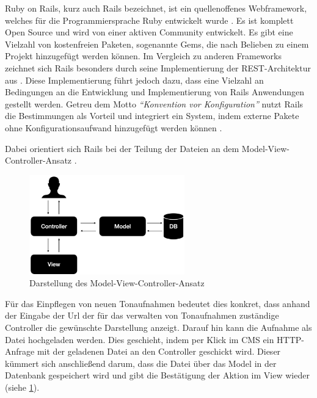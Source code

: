 Ruby on Rails, kurz auch Rails bezeichnet, ist ein quellenoffenes Webframework, welches für die Programmiersprache Ruby entwickelt wurde \parencites[vgl.][S.4]{hartl_ruby_2016}{ruby_org}[vgl.][S. 24]{sieben_wochen}. Es ist komplett Open Source und wird von einer aktiven Community entwickelt. Es gibt eine Vielzahl von kostenfreien Paketen, sogenannte Gems, die nach Belieben zu einem Projekt hinzugefügt werden können. Im Vergleich zu anderen Frameworks zeichnet sich Rails besonders durch seine Implementierung der REST-Architektur aus \parencite[vgl.][S. 5]{hartl_ruby_2016}. Diese Implementierung führt jedoch dazu, dass eine Vielzahl an Bedingungen an die Entwicklung und Implementierung von Rails Anwendungen gestellt werden. Getreu dem Motto \textit{\enquote{Konvention vor Konfiguration}} nutzt Rails die Bestimmungen als Vorteil und integriert ein System, indem externe Pakete ohne Konfigurationsaufwand hinzugefügt werden können \parencite{ruby_doctrine}.

Dabei orientiert sich Rails bei der Teilung der Dateien an dem Model-View-Controller-Ansatz \parencites[vgl.][S. 66 ff.]{hartl_ruby_2016}.

\begin{figure}
	\centering
	\includegraphics[width=0.6\textwidth]{Assets/CMS_V1}
	\caption{Darstellung des Model-View-Controller-Ansatz}
	\label{fig:mvc-plurapolit}
\end{figure}

 Für das Einpflegen von neuen Tonaufnahmen bedeutet dies konkret, dass anhand der Eingabe der Url der für das verwalten von Tonaufnahmen zuständige Controller die gewünschte Darstellung anzeigt.
Darauf hin kann die Aufnahme als Datei hochgeladen werden. Dies geschieht, indem per Klick im CMS ein HTTP-Anfrage mit der geladenen Datei an den Controller geschickt wird. Dieser kümmert sich anschließend darum, dass die Datei über das Model in der Datenbank gespeichert wird und gibt die Bestätigung der Aktion im View wieder (siehe \cref{fig:mvc-plurapolit}).

